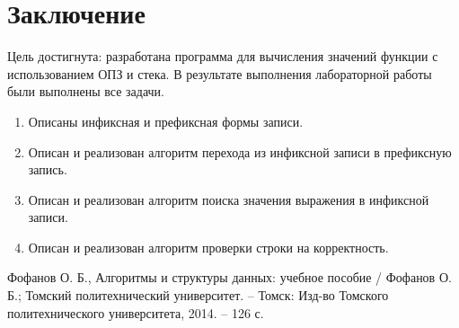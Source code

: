 \documentclass[12pt, a4paper]{article}
\begin{document}
\section*{Заключение}
Цель достигнута: разработана программа для вычисления значений функции 
с использованием ОПЗ и стека.
В результате выполнения лабораторной работы были выполнены все задачи.
\begin{enumerate}
	\item Описаны инфиксная и префиксная формы записи.
	\item Описан и реализован алгоритм перехода из инфиксной записи в 
	префиксную запись.
	\item Описан и реализован алгоритм поиска значения выражения в 
	инфиксной записи.
	\item Описан и реализован алгоритм проверки строки на корректность.
\end{enumerate}
\newpage
\begin{center}
\begin{thebibliography}{}
Фофанов О. Б., Алгоритмы и структуры данных: 
учебное пособие / Фофанов О. Б.; Томский политехнический университет. – 
Томск: Изд-во Томского политехнического университета, 2014. – 126 с.
\end{thebibliography}
\end{center}
\end{document}
